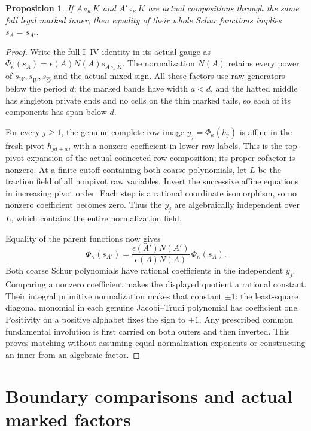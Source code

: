 \documentclass[11pt,a4paper]{amsart}
\numberwithin{equation}{section}
\theoremstyle{plain}
\newtheorem{proposition}[theorem]{Proposition}
\theoremstyle{definition}
\begin{document}
\begin{proposition}\label{ge:remark:same-mark}
If \(A\circ_\kappa K\) and \(A'\circ_\kappa K\) are actual
compositions through the same full legal marked inner, then equality of
their whole Schur functions implies \(s_A=s_{A'}\).
\end{proposition}
\begin{proof}
Write the full I--IV identity in its actual gauge as
\(\Phi_\kappa(s_A)=\epsilon(A)N(A)s_{A\circ_\kappa K}\).
The normalization \(N(A)\) retains every power of \(s_W,s_{\widehat
W},s_{\widehat O}\) and the actual mixed sign.  All these factors use
raw generators below the period \(d\): the marked bands have width
\(a<d\), and the hatted middle has singleton private ends and no cells
on the thin marked tails, so each of its components has span below \(d\).

For every \(j\ge1\), the genuine complete-row image
\(y_j=\Phi_\kappa(h_j)\) is affine in the fresh pivot
\(h_{jd+a}\), with a nonzero coefficient in lower raw labels.  This is
the top-pivot expansion of the actual connected row composition; its
proper cofactor is nonzero.  At a finite cutoff containing both coarse
polynomials, let \(L\) be the fraction field of all nonpivot raw
variables.  Invert the successive affine equations in increasing pivot
order.  Each step is a rational coordinate isomorphism, so no nonzero
coefficient becomes zero.  Thus the \(y_j\) are algebraically independent
over \(L\), which contains the entire normalization field.

Equality of the parent functions now gives
\[
 \Phi_\kappa(s_{A'})=
 \frac{\epsilon(A')N(A')}{\epsilon(A)N(A)}\,
 \Phi_\kappa(s_A).
\]
Both coarse Schur polynomials have rational coefficients in the independent
\(y_j\).  Comparing a nonzero coefficient makes the displayed quotient
a rational constant.  Their integral primitive normalization makes that
constant \(\pm1\): the least-square diagonal monomial in each genuine
Jacobi--Trudi polynomial has coefficient one.  Positivity on a positive
alphabet fixes the sign to \(+1\).  Any prescribed common fundamental
involution is first carried on both outers and then inverted.  This
proves matching without assuming equal normalization exponents or
constructing an inner from an algebraic factor.
\end{proof}

\section{Boundary comparisons and actual marked factors}\label{sec:boundary}
\end{document}
